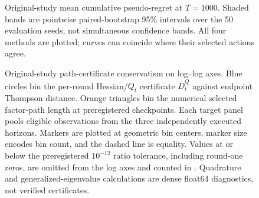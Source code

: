 \begin{ccewidefloatappendix}
  \caption{Original-study certificate and bound tightness for the transport-Hessian policy.
  The reported summary statistics are medians over the following populations.
  Terminal historical-radius and cumulative current-bias entries, and terminal
  width/bound ratios summarize 50 runs per cell.  Path ratios pool eligible
  seed--round or seed--checkpoint observations, while $e^{\bar D_t^Q/2}$ pools
  all seed--round values.
  $n_0$ counts denominators at or below the preregistered ratio tolerance that
  are excluded from that ratio.  ``Width/potential'' is the frozen squared-width
  sum divided by its elliptic-potential upper bound; ``Sharp/simple'' is the
  sharp cumulative right-hand side divided by the simpler right-hand side.}
  \label{tab:transport-instantiation-tightness}

\end{ccewidefloatappendix}
\clearpage

\begin{figure}[p]
  \centering
  
  \caption{Original-study mean cumulative pseudo-regret at $T=1000$.  Shaded bands are
  pointwise paired-bootstrap 95\% intervals over the 50 evaluation seeds, not
  simultaneous confidence bands.  All four methods are plotted; curves can
  coincide where their selected actions agree.}
  \label{fig:transport-instantiation-regret}
\end{figure}
\clearpage

\begin{figure}[p]
  \centering
  
  \caption{Original-study path-certificate conservatism on log--log axes.  Blue circles bin
  the per-round Hessian/$Q_t$ certificate $\bar D_t^Q$ against endpoint
  Thompson distance.  Orange triangles bin the numerical selected factor-path
  length at preregistered checkpoints.  Each target panel pools eligible
  observations from the three independently executed horizons.  Markers are
  plotted at geometric bin centers, marker size encodes bin count, and the
  dashed line is equality.  Values at or below the
  preregistered $10^{-12}$ ratio tolerance, including round-one zeros, are
  omitted from the log axes and counted in
  .  Quadrature and
  generalized-eigenvalue calculations are dense float64 diagnostics, not
  verified certificates.}
  \label{fig:transport-instantiation-tightness}
\end{figure}
\clearpage

